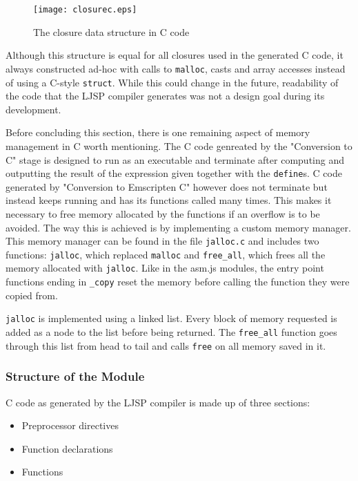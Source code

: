 \documentclass[11pt]{report}
\begin{document}
\begin{figure}[ht]
\begin{center}
\texttt{[image: closurec.eps]}
\end{center}
\caption{The closure data structure in C code}
\label{cclosure}
\end{figure}

Although this structure is equal for all closures used in the generated C code, it always constructed ad-hoc with calls to \texttt{malloc}, casts and array accesses instead of using a C-style \texttt{struct}. While this could change in the future, readability of the code that the LJSP compiler generates was not a design goal during its development.

Before concluding this section, there is one remaining aspect of memory management in C worth mentioning. The C code genreated by the "Conversion to C" stage is designed to run as an executable and terminate after computing and outputting the result of the expression given together with the \texttt{define}s. C code generated by "Conversion to Emscripten C" however does not terminate but instead keeps running and has its functions called many times. This makes it necessary to free memory allocated by the functions if an overflow is to be avoided. The way this is achieved is by implementing a custom memory manager. This memory manager can be found in the file \texttt{jalloc.c} and includes two functions: \texttt{jalloc}, which replaced \texttt{malloc} and \texttt{free_all}, which frees all the memory allocated with \texttt{jalloc}. Like in the asm.js modules, the entry point functions ending in \texttt{_copy} reset the memory before calling the function they were copied from.

\texttt{jalloc} is implemented using a linked list. Every block of memory requested is added as a node to the list before being returned. The \texttt{free_all} function goes through this list from head to tail and calls \texttt{free} on all memory saved in it.

\subsubsection{Structure of the Module}
C code as generated by the LJSP compiler is made up of three sections:
\begin{itemize}
\item Preprocessor directives
\item Function declarations
\item Functions
\end{itemize}
\end{document}

